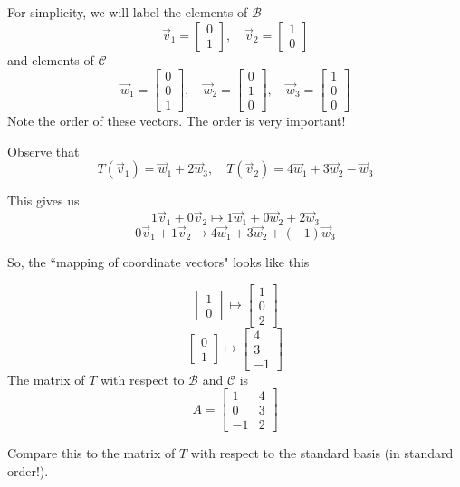 \documentclass{ximera}
\begin{document}
\begin{example}
\begin{explanation}
For simplicity, we will label the elements of $\mathcal{B}$
$$\vec{v}_1=\begin{bmatrix}0\\1\end{bmatrix},\quad\vec{v}_2=\begin{bmatrix}1\\0\end{bmatrix}$$
and elements of $\mathcal{C}$
$$\vec{w}_1=\begin{bmatrix}0\\0\\1\end{bmatrix},\quad\vec{w}_2=\begin{bmatrix}0\\1\\0\end{bmatrix},\quad\vec{w}_3=\begin{bmatrix}1\\0\\0\end{bmatrix}$$
Note the order of these vectors.  The order is very important!

Observe that $$T(\vec{v}_1)=\vec{w}_1+2\vec{w}_3,\quad T(\vec{v}_2)=4\vec{w}_1+3\vec{w}_2-\vec{w}_3$$

This gives us
$$1\vec{v}_1+0\vec{v}_2\mapsto 1\vec{w}_1+0\vec{w}_2+2\vec{w}_3$$
$$0\vec{v}_1+1\vec{v}_2\mapsto 4\vec{w}_1+3\vec{w}_2+(-1)\vec{w}_3$$

So, the ``mapping of coordinate vectors" looks like this

$$\begin{bmatrix}1\\0\end{bmatrix}\mapsto\begin{bmatrix}1\\0\\2\end{bmatrix}$$
$$\begin{bmatrix}0\\1\end{bmatrix}\mapsto\begin{bmatrix}4\\3\\-1\end{bmatrix}$$
The matrix of $T$ with respect to $\mathcal{B}$ and $\mathcal{C}$ is 
$$A=\begin{bmatrix}1&4\\0&3\\-1&2\end{bmatrix}$$

Compare this to the matrix of $T$ with respect to the standard basis (in standard order!).
\end{explanation}
\end{example}
\end{document}
